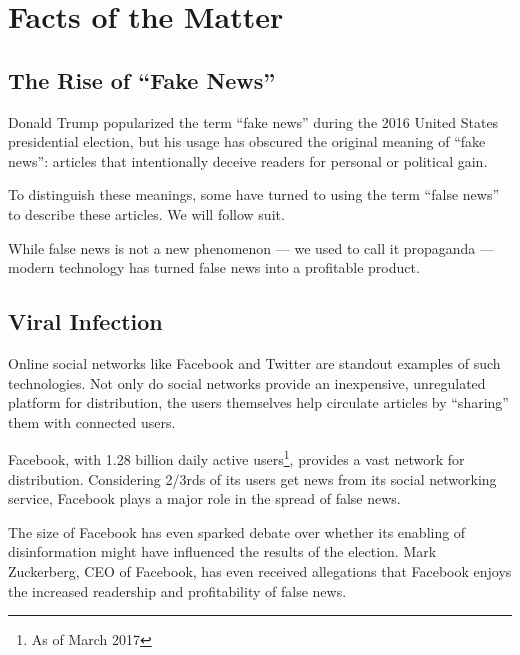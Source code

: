 

\section{Facts of the Matter}

\subsection{The Rise of ``Fake News''}

\par Donald Trump popularized the term ``fake news'' during the 2016 United States presidential election, \cite{telegraph_fake_news} but his usage has obscured the original meaning of ``fake news'': articles that intentionally deceive readers for personal or political gain. \cite{npr_fake_news}

\par To distinguish these meanings, some have turned to using the term ``false news'' to describe these articles. \cite{guardian_fb_tips} We will follow suit.

\par While false news is not a new phenomenon --- we used to call it propaganda --- modern technology has turned false news into a profitable product. \cite{bbc_fn_propaganda}

\subsection{Viral Infection}

\par Online social networks like Facebook and Twitter are standout examples of such technologies. Not only do social networks provide an inexpensive, unregulated platform for distribution, \cite{telegraph_fake_news} the users themselves help circulate articles by ``sharing'' them with connected users. \cite{telegraph_fake_news} 

\par Facebook, with 1.28 billion daily active users\footnote{As of March 2017}, \cite{fb_newsroom} provides a vast network for distribution. Considering 2/3rds of its users get news from its social networking service, \cite{pew_social_media_news} Facebook plays a major role in the spread of false news.

\par The size of Facebook has even sparked debate over whether its enabling of disinformation might have influenced the results of the election. \cite{bbc_facebook_fake_news_crisis, wp_russian_election_propaganda} Mark Zuckerberg, CEO of Facebook, has even received allegations that Facebook enjoys the increased readership and profitability of false news. \cite{tc_facebook_responsibility}

